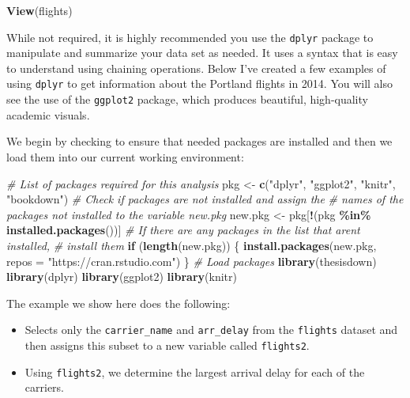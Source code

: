 \documentclass[12pt,twoside]{book}
\newenvironment{Shaded}{\begin{snugshade}}{\end{snugshade}}
\newcommand{\AttributeTok}[1]{\textcolor[rgb]{0.13,0.29,0.53}{#1}}
\newcommand{\CommentTok}[1]{\textcolor[rgb]{0.56,0.35,0.01}{\textit{#1}}}
\newcommand{\ControlFlowTok}[1]{\textcolor[rgb]{0.13,0.29,0.53}{\textbf{#1}}}
\newcommand{\FunctionTok}[1]{\textcolor[rgb]{0.13,0.29,0.53}{\textbf{#1}}}
\newcommand{\NormalTok}[1]{#1}
\newcommand{\OtherTok}[1]{\textcolor[rgb]{0.56,0.35,0.01}{#1}}
\newcommand{\SpecialCharTok}[1]{\textcolor[rgb]{0.81,0.36,0.00}{\textbf{#1}}}
\newcommand{\StringTok}[1]{\textcolor[rgb]{0.31,0.60,0.02}{#1}}
\begin{document}
\begin{Shaded}
\begin{Highlighting}[]
\FunctionTok{View}\NormalTok{(flights)}
\end{Highlighting}
\end{Shaded}

While not required, it is highly recommended you use the \texttt{dplyr} package to manipulate and summarize your data set as needed. It uses a syntax that is easy to understand using chaining operations. Below I've created a few examples of using \texttt{dplyr} to get information about the Portland flights in 2014. You will also see the use of the \texttt{ggplot2} package, which produces beautiful, high-quality academic visuals.

We begin by checking to ensure that needed packages are installed and then we load them into our current working environment:

\begin{Shaded}
\begin{Highlighting}[]
\CommentTok{\# List of packages required for this analysis}
\NormalTok{pkg }\OtherTok{\textless{}{-}} \FunctionTok{c}\NormalTok{(}\StringTok{"dplyr"}\NormalTok{, }\StringTok{"ggplot2"}\NormalTok{, }\StringTok{"knitr"}\NormalTok{, }\StringTok{"bookdown"}\NormalTok{)}
\CommentTok{\# Check if packages are not installed and assign the}
\CommentTok{\# names of the packages not installed to the variable new.pkg}
\NormalTok{new.pkg }\OtherTok{\textless{}{-}}\NormalTok{ pkg[}\SpecialCharTok{!}\NormalTok{(pkg }\SpecialCharTok{\%in\%} \FunctionTok{installed.packages}\NormalTok{())]}
\CommentTok{\# If there are any packages in the list that aren\textquotesingle{}t installed,}
\CommentTok{\# install them}
\ControlFlowTok{if}\NormalTok{ (}\FunctionTok{length}\NormalTok{(new.pkg)) \{}
  \FunctionTok{install.packages}\NormalTok{(new.pkg, }\AttributeTok{repos =} \StringTok{"https://cran.rstudio.com"}\NormalTok{)}
\NormalTok{\}}
\CommentTok{\# Load packages}
\FunctionTok{library}\NormalTok{(thesisdown)}
\FunctionTok{library}\NormalTok{(dplyr)}
\FunctionTok{library}\NormalTok{(ggplot2)}
\FunctionTok{library}\NormalTok{(knitr)}
\end{Highlighting}
\end{Shaded}

\clearpage

The example we show here does the following:

\begin{itemize}
\item
  Selects only the \texttt{carrier\_name} and \texttt{arr\_delay} from the \texttt{flights} dataset and then assigns this subset to a new variable called \texttt{flights2}.
\item
  Using \texttt{flights2}, we determine the largest arrival delay for each of the carriers.
\end{itemize}
\end{document}
